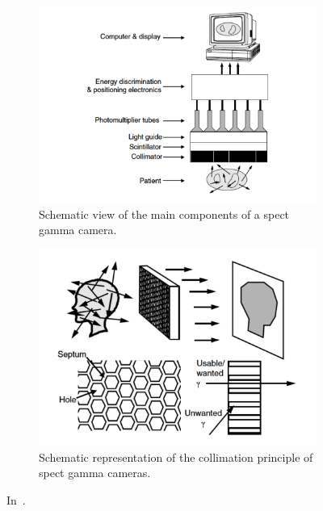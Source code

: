  \begin{figure}[!htbp]
\begin{subfigure}[t]{.49\textwidth}
\centering
\includegraphics[width=0.98\linewidth]{03_GraphicFiles/chapter1_Introduction/SPECT_components.pdf}
\caption{Schematic view of the main components of a \gls{spect} gamma camera.}
\label{chap2::fig::SPECT_components}
\end{subfigure}
\begin{subfigure}[t]{.49\textwidth}
\centering
\includegraphics[width=0.98\linewidth]{03_GraphicFiles/chapter1_Introduction/SPECT_collimator.pdf}
\caption{Schematic representation of the collimation principle of \gls{spect} gamma cameras.}
\label{chap2::fig::SPECT_collimator}
\end{subfigure}
\caption{In~\cite{Zeng2004}.}
\label{chap2::fig::SPECT_details}
\end{figure} 

